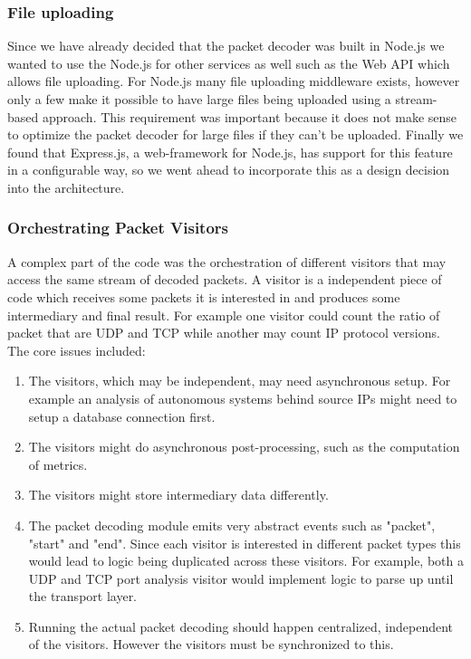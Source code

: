 \subsubsection{File uploading}
Since we have already decided that the packet decoder was built in Node.js we wanted to use the Node.js for other services as well such as the Web API which allows file uploading. For Node.js many file uploading middleware exists, however only a few make it possible to have large files being uploaded using a stream-based approach. This requirement was important because it does not make sense to optimize the packet decoder for large files if they can't be uploaded. Finally we found that Express.js, a web-framework for Node.js, has support for this feature in a configurable way, so we went ahead to incorporate this as a design decision into the architecture. 
\subsubsection{Orchestrating Packet Visitors}
A complex part of the code was the orchestration of different visitors that may access the same stream of decoded packets. A visitor is a independent piece of code which receives some packets it is interested in and produces some intermediary and final result. For example one visitor could count the ratio of packet that are UDP and TCP while another may count IP protocol versions. The core issues included:

\begin{enumerate}
    \item The visitors, which may be independent, may need asynchronous setup. For example an analysis of autonomous systems behind source IPs might need to setup a database connection first.
    \item The visitors might do asynchronous post-processing, such as the computation of metrics.
    \item The visitors might store intermediary data differently.
    \item The packet decoding module emits very abstract events such as "packet", "start" and "end". Since each visitor is interested in different packet types this would lead to logic being duplicated across these visitors. For example, both a UDP and TCP port analysis visitor would implement logic to parse up until the transport layer.
    \item Running the actual packet decoding should happen centralized, independent of the visitors. However the visitors must be synchronized to this.
\end{enumerate}{}

